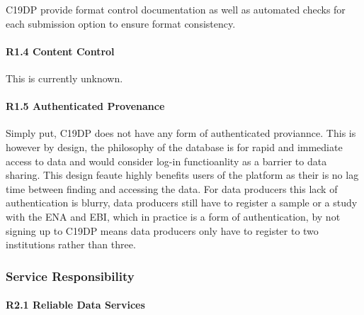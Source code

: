 \documentclass{article}
\begin{document}
C19DP provide format control documentation as well as automated checks
for each submission option to ensure format consistency.

\hypertarget{r1.4-content-control-1}{%
\paragraph{R1.4 Content Control}\label{r1.4-content-control-1}}

This is currently unknown.

\hypertarget{r1.5-authenticated-provenance-1}{%
\paragraph{R1.5 Authenticated
Provenance}\label{r1.5-authenticated-provenance-1}}

Simply put, C19DP does not have any form of authenticated proviannce.
This is however by design, the philosophy of the database is for rapid
and immediate access to data and would consider log-in functioanlity as
a barrier to data sharing. This design feaute highly benefits users of
the platform as their is no lag time between finding and accessing the
data. For data producers this lack of authentication is blurry, data
producers still have to register a sample or a study with the ENA and
EBI, which in practice is a form of authentication, by not signing up to
C19DP means data producers only have to register to two institutions
rather than three.

\hypertarget{service-responsibility-2}{%
\subsubsection{Service Responsibility}\label{service-responsibility-2}}

\hypertarget{r2.1-reliable-data-services-1}{%
\paragraph{R2.1 Reliable Data
Services}\label{r2.1-reliable-data-services-1}}
\end{document}
